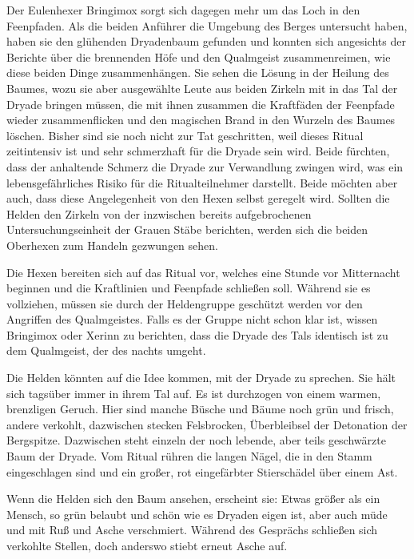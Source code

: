 Der Eulenhexer Bringimox sorgt sich dagegen mehr um das Loch in den Feenpfaden.
Als die beiden Anführer die Umgebung des Berges untersucht haben, haben sie den glühenden Dryadenbaum gefunden und konnten sich angesichts der Berichte über die brennenden Höfe und den Qualmgeist zusammenreimen, wie diese beiden Dinge zusammenhängen.
Sie sehen die Lösung in der Heilung des Baumes, wozu sie aber ausgewählte Leute aus beiden Zirkeln mit in das Tal der Dryade bringen müssen, die mit ihnen zusammen die Kraftfäden der Feenpfade wieder zusammenflicken und den magischen Brand in den Wurzeln des Baumes löschen.
Bisher sind sie noch nicht zur Tat geschritten, weil dieses Ritual zeitintensiv ist und sehr schmerzhaft für die Dryade sein wird.
Beide fürchten, dass der anhaltende Schmerz die Dryade zur Verwandlung zwingen wird, was ein lebensgefährliches Risiko für die Ritualteilnehmer darstellt.
Beide möchten aber auch, dass diese Angelegenheit von den Hexen selbst geregelt wird.
Sollten die Helden den Zirkeln von der inzwischen bereits aufgebrochenen Untersuchungseinheit der Grauen Stäbe berichten, werden sich die beiden Oberhexen zum Handeln gezwungen sehen.

\newpage
{}
Die Hexen bereiten sich auf das Ritual vor, welches eine Stunde vor Mitternacht beginnen und die Kraftlinien und Feenpfade schließen soll.
Während sie es vollziehen, müssen sie durch der Heldengruppe geschützt werden vor den Angriffen des Qualmgeistes.
Falls es der Gruppe nicht schon klar ist, wissen Bringimox oder Xerinn zu berichten, dass die Dryade des Tals identisch ist zu dem Qualmgeist, der des nachts umgeht.


Die Helden könnten auf die Idee kommen, mit der Dryade zu sprechen.
Sie hält sich tagsüber immer in ihrem Tal auf.
Es ist durchzogen von einem warmen, brenzligen Geruch.
Hier sind manche Büsche und Bäume noch grün und frisch, andere verkohlt, dazwischen stecken Felsbrocken, Überbleibsel der Detonation der Bergspitze.
Dazwischen steht einzeln der noch lebende, aber teils geschwärzte Baum der Dryade.
Vom Ritual rühren die langen Nägel, die in den Stamm eingeschlagen sind und ein großer, rot eingefärbter Stierschädel über einem Ast.

Wenn die Helden sich den Baum ansehen, erscheint sie:
Etwas größer als ein Mensch, so grün belaubt und schön wie es Dryaden eigen ist, aber auch müde und mit Ruß und Asche verschmiert.
Während des Gesprächs schließen sich verkohlte Stellen, doch anderswo stiebt erneut Asche auf.


